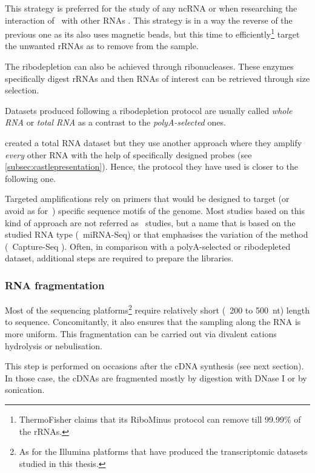 This strategy is preferred for the study of any \gls{ncRNA} or when researching
the interaction of \mRNAs\ with other \glspl{RNA} . This
strategy is in a way the reverse of the previous one as its also
uses magnetic beads, but this time to efficiently\footnote{ThermoFisher claims
that its RiboMinus protocol can remove till 99.99\% of the \glspl{rRNA}.}
target the unwanted \glspl{rRNA} as to remove from the sample.

The ribodepletion can also be achieved through ribonucleases. These enzymes
specifically digest \glspl{rRNA} and then \glspl{RNA} of interest can be retrieved
through size selection.

Datasets produced following a ribodepletion protocol are usually called
\emph{whole \gls{RNA}} or \emph{total \gls{RNA}} as a contrast to the
\emph{polyA-selected} ones.

\cite{castleData} created a total \gls{RNA} dataset but they use another
approach where they amplify \emph{every} other \gls{RNA} with the help of
specifically designed probes (see \cref{subsec:castlepresentation}). Hence,
the protocol they have used is closer to the following one.

Targeted amplifications rely on primers that would be designed to target (or
avoid as for~\cite{castleData}) specific sequence motifs of the genome. Most
studies based on this kind of approach are not referred as \Rnaseq\ studies, but
a name that is based on the studied \gls{RNA} type (\eg\ \gls{miRNA-Seq}) or
that emphasises the variation of the method (\eg\ Capture-Seq
). Often, in comparison with a polyA-selected or ribodepleted
dataset, additional steps are required to prepare the libraries.


\subsubsection{RNA fragmentation}

Most of the sequencing platforms\footnote{As for the Illumina platforms that have
produced the transcriptomic datasets studied in this thesis.} require relatively
short (\ie\ 200 to 500\ nt) length to sequence. Concomitantly, it also ensures
that the sampling along the \gls{RNA} is more uniform.
This fragmentation can be carried out via divalent cations hydrolysis or
nebulisation.

This step is performed on occasions after the \gls{cDNA} synthesis
(see next section). In those case, the \glspl{cDNA} are fragmented mostly
by digestion with DNase I or by sonication.

